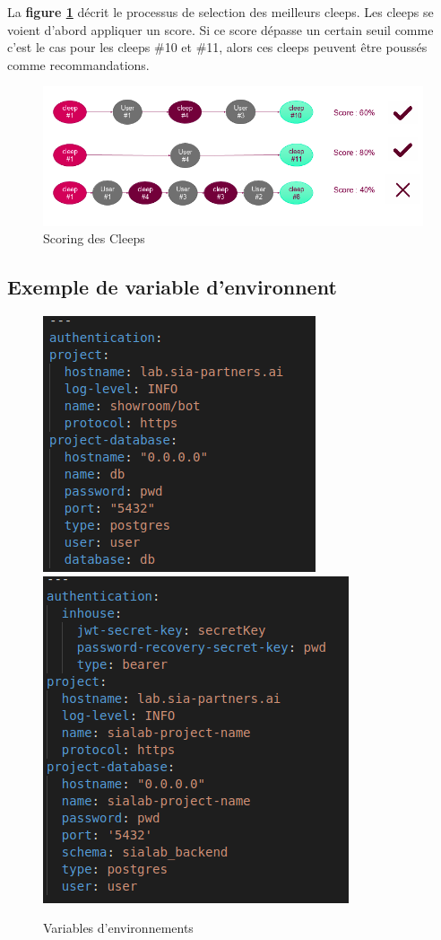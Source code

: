 \documentclass{article} %
\begin{document}
La \textbf{figure \ref{fig:ex5}} décrit le processus de selection des meilleurs cleeps. Les cleeps se voient d'abord appliquer un score. Si ce score dépasse un certain seuil comme c'est le cas pour les cleeps \#10 et \#11, alors ces cleeps peuvent être poussés comme recommandations.

\begin{figure}[!h]
	\centering
	\includegraphics[keepaspectratio = true,scale=0.6]{ex5}
	\caption{Scoring des Cleeps}
	\label{fig:ex5}
\end{figure}
\newpage

\subsection{Exemple de variable d'environnent}

\begin{figure}[!h]
	\centering
	\includegraphics[keepaspectratio = true,scale=0.6]{botvariable.png}
	\includegraphics[keepaspectratio = true,scale=0.6]{projectvariable.png}
	\caption{Variables d'environnements}
	\label{fig:varenv}
\end{figure}
\end{document}
